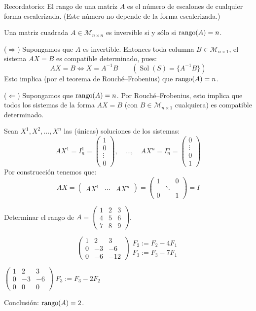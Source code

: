 \documentclass[11pt,a4paper]{article}
\newcommand{\M}{\mathcal{M}}
\DeclareMathOperator{\Sol}{Sol}
\begin{document}
Recordatorio: El rango de una matriz $A$ es el número de escalones de cualquier forma escalerizada. (Este número no depende de la forma escalerizada.)

\begin{proposicion}
Una matriz cuadrada $A\in\M_{n\times n}$ es inversible si y sólo si $\operatorname{rango}(A)=n$.
\end{proposicion}

\begin{demo}
($\Rightarrow$) Supongamos que $A$ es invertible. Entonces toda columna $B\in\M_{n\times1}$, el sistema $AX=B$ es compatible determinado, pues:
\[
AX=B\iff X=A^{-1}B\qquad(\Sol(S)=\{A^{-1}B\})
\]
Esto implica (por el teorema de Rouché--Frobenius) que $\operatorname{rango}(A)=n$.

($\Leftarrow$) Supongamos que $\operatorname{rango}(A)=n$. Por Rouché--Frobenius, esto implica que todos los sistemas de la forma $AX=B$ (con $B\in\M_{n\times1}$ cualquiera) es compatible determinado.

Sean $X^1,X^2,\dots,X^n$ las (únicas) soluciones de los sistemas:
\[
AX^1=I_n^1=\begin{pmatrix}1\\0\\\vdots\\0\end{pmatrix},\quad\dots,\quad AX^n=I_n^n=\begin{pmatrix}0\\\vdots\\0\\1\end{pmatrix}
\]
Por construcción tenemos que:
\[
AX=\begin{pmatrix}AX^1&\cdots&AX^n\end{pmatrix}=\begin{pmatrix}1&&0\\&\ddots&\\0&&1\end{pmatrix}=I
\]
\end{demo}

\begin{ejercicio}
Determinar el rango de $A=\begin{pmatrix}1&2&3\\4&5&6\\7&8&9\end{pmatrix}$.
\end{ejercicio}
\begin{solucion}
\[
\begin{pmatrix}1&2&3\\0&-3&-6\\0&-6&-12\end{pmatrix}
\begin{array}{l}F_2:=F_2-4F_1\\F_3:=F_3-7F_1\end{array}
\]
\begin{center}
$\displaystyle\begin{pmatrix}1&2&3\\0&-3&-6\\0&0&0\end{pmatrix}\;F_3:=F_3-2F_2$
\end{center}
Conclusión: $\operatorname{rango}(A)=2$.
\end{solucion}
\end{document}
